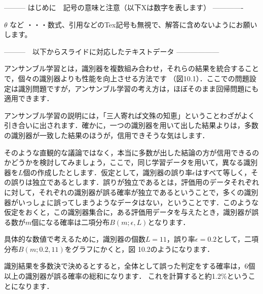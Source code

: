 --------- はじめに　記号の意味と注意（以下Xは数字を表します） -------------

$\theta$ など       ・・・数式、引用などのTex記号も無視で、解答に含めないようにお願いします。
\cite{mitchell97}

---------　以下からスライドに対応したテキストデータ ------------------



アンサンブル学習とは，識別器を複数組み合わせ，それらの結果を統合することで，個々の識別器よりも性能を向上させる方法です
（図10.1）．ここでの問題設定は識別問題ですが，アンサンブル学習の考え方は，ほぼそのまま回帰問題にも適用できます．


アンサンブル学習の説明には，「三人寄れば文殊の知恵」ということわざがよく引き合いに出されます．確かに，一つの識別器を用いて出した結果よりは，多数の識別器が一致した結果のほうが，信用できそうな気はします．

そのような直観的な議論ではなく，本当に多数が出した結論の方が信用できるのかどうかを検討してみましょう，ここで，同じ学習データを用いて，異なる識別器を$L$個の作成したとします．仮定として，識別器の誤り率$\epsilon$はすべて等しく，その誤りは独立であるとします．誤りが独立であるとは，評価用のデータそれぞれに対して，それぞれの識別器が誤る確率が独立であるということで，多くの識別器がいっしょに誤ってしまうようなデータはない，ということです．このような仮定をおくと，この識別器集合に，ある評価用データを与えたとき，識別器が誤る数が$m$個になる確率は二項分布$B(m; \epsilon, L)$となります．



具体的な数値で考えるために，識別器の個数$L=11$，誤り率$\epsilon=0.2$として，二項分布$B(m; 0.2, 11)$をグラフにかくと，図
10.2のようになります．


識別結果を多数決で決めるとすると，全体として誤った判定をする確率は，6個以上の識別器が誤る確率の総和になります．
これを計算すると約1.2\%ということになります．

